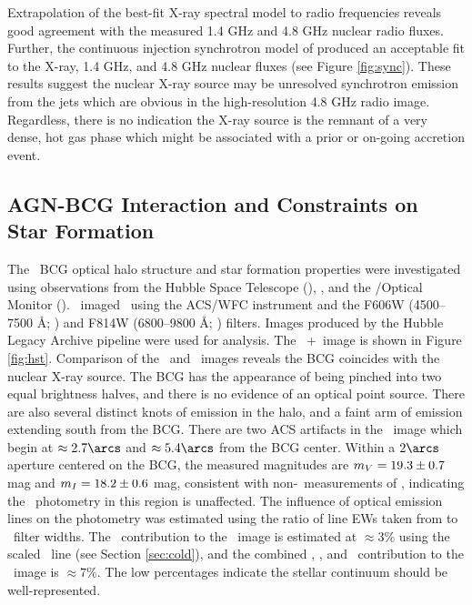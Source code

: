 \documentclass[11pt, preprint]{aastex}
\begin{document}
Extrapolation of the best-fit X-ray spectral model to radio
frequencies reveals good agreement with the measured 1.4 GHz and 4.8
GHz nuclear radio fluxes. Further, the continuous injection
synchrotron model of \citet{1987MNRAS.225..335H} produced an
acceptable fit to the X-ray, 1.4 GHz, and 4.8 GHz nuclear fluxes (see
Figure \ref{fig:sync}). These results suggest the nuclear X-ray source
may be unresolved synchrotron emission from the jets which are obvious
in the high-resolution 4.8 GHz radio image. Regardless, there is no
indication the X-ray source is the remnant of a very dense, hot gas
phase which might be associated with a prior or on-going accretion
event.

\subsection{AGN-BCG Interaction and Constraints on Star Formation}
\label{sec:bcg}

The \rbs\ BCG optical halo structure and star formation properties
were investigated using observations from the Hubble Space Telescope
(\hst), \galex, and the \xmm/Optical Monitor (\xom). \hst\ imaged
\rbs\ using the ACS/WFC instrument and the F606W (4500--7500 \AA;
\myv) and F814W (6800--9800 \AA; \myi) filters. Images produced by the
Hubble Legacy Archive pipeline were used for analysis. The
\hst\ \myv+\myi\ image is shown in Figure \ref{fig:hst}. Comparison of
the \hst\ and \cxo\ images reveals the BCG coincides with the nuclear
X-ray source. The BCG has the appearance of being pinched into two
equal brightness halves, and there is no evidence of an optical point
source. There are also several distinct knots of emission in the halo,
and a faint arm of emission extending south from the BCG. There are
two ACS artifacts in the \myi\ image which begin at $\approx 2.7\arcs$
and $\approx 5.4\arcs$ from the BCG center. Within a $2\arcs$ aperture
centered on the BCG, the measured magnitudes are $m_{V} = 19.3 \pm
0.7$ mag and $m_{I} = 18.2 \pm 0.6$ mag, consistent with
non-\hst\ measurements of \citet{rbs1}, indicating the
\hst\ photometry in this region is unaffected. The influence of
optical emission lines on the photometry was estimated using the ratio
of line EWs taken from \citet{rbs1} to \hst\ filter widths. The
\halpha\ contribution to the \myi\ image is estimated at $\approx 3\%$
using the scaled \hbeta\ line (see Section \ref{sec:cold}), and the
combined \hbeta, \oii, and \oiii\ contribution to the \myv\ image is
$\approx 7\%$. The low percentages indicate the stellar continuum
should be well-represented.
\end{document}
